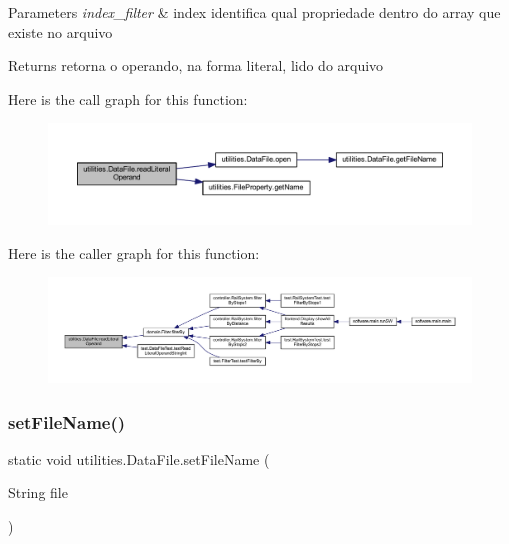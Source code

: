\begin{DoxyParams}{Parameters}
{\em index\+\_\+filter} & index identifica qual propriedade dentro do array que existe no arquivo \\
\hline
\end{DoxyParams}
\begin{DoxyReturn}{Returns}
retorna o operando, na forma literal, lido do arquivo 
\end{DoxyReturn}
Here is the call graph for this function\+:\nopagebreak
\begin{figure}[H]
\begin{center}
\leavevmode
\includegraphics[width=350pt]{classutilities_1_1_data_file_adb4c1c9272d3497615385f4f8278ab60_cgraph}
\end{center}
\end{figure}
Here is the caller graph for this function\+:\nopagebreak
\begin{figure}[H]
\begin{center}
\leavevmode
\includegraphics[width=350pt]{classutilities_1_1_data_file_adb4c1c9272d3497615385f4f8278ab60_icgraph}
\end{center}
\end{figure}
\mbox{\label{classutilities_1_1_data_file_a03d4af9888db5dfd5031fd3ead4964bf}} 
\subsubsection{\texorpdfstring{set\+File\+Name()}{setFileName()}}
{\footnotesize\ttfamily static void utilities.\+Data\+File.\+set\+File\+Name (\begin{DoxyParamCaption}\item[{String}]{file }\end{DoxyParamCaption})\hspace{0.3cm}{\ttfamily [static]}}

